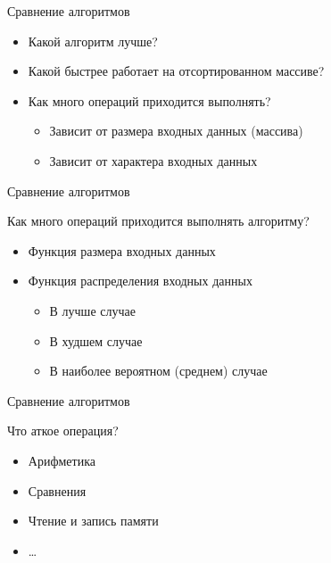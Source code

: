 \documentclass[aspectratio=169,14pt]{beamer}
\begin{document}
    \begin{frame}{Сравнение алгоритмов}
        \begin{itemize}
            \item<1-> Какой алгоритм лучше?
            \item<2-> Какой быстрее работает на отсортированном массиве?
            \item<3-> Как много операций приходится выполнять?
                \begin{itemize}
                    \item<4-> Зависит от размера входных данных (массива)
                    \item<5-> Зависит от характера входных данных
                \end{itemize}
        \end{itemize}
    \end{frame}

    \begin{frame}{Сравнение алгоритмов}
        \begin{block}{Как много операций приходится выполнять алгоритму?}
            \begin{itemize}
                \item<1-> Функция размера входных данных
                \item<1-> Функция распределения входных данных
                \begin{itemize}
                    \item<2-> В лучше случае
                    \item<3-> В худшем случае
                    \item<4-> В наиболее вероятном (среднем) случае
                \end{itemize}
            \end{itemize}
        \end{block}
    \end{frame}

    \begin{frame}{Сравнение алгоритмов}
        \begin{block}{Что аткое операция?}
            \begin{itemize}
                \item<1-> Арифметика
                \item<2-> Сравнения
                \item<3-> Чтение и запись памяти
                \item<4-> \dots
            \end{itemize}
        \end{block}
    \end{frame}
\end{document}
